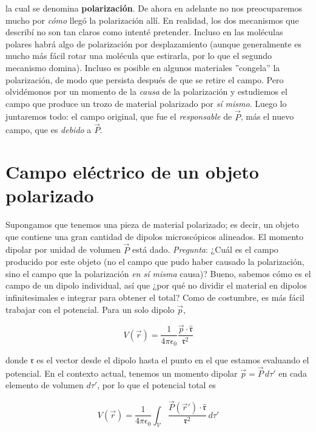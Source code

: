 \documentclass[12pt,a4paper]{report}
\newcommand{\esp}{\vspace{0.5cm}}
\begin{document}
	\noindent la cual se denomina \textbf{polarización}. De ahora en adelante no nos preocuparemos mucho por \textit{cómo} llegó la polarización allí. En realidad, los dos mecanismos que describí no son tan claros como intenté pretender. Incluso en las moléculas polares habrá algo de polarización por desplazamiento (aunque generalmente es mucho más fácil rotar una molécula que estirarla, por lo que el segundo mecanismo domina). Incluso es posible en algunos materiales ''congela'' la polarización, de modo que persista después de que se retire el campo. Pero olvidémonos por un momento de la \textit{causa} de la polarización y estudiemos el campo que produce un trozo de material polarizado por \textit{sí mismo}. Luego lo juntaremos todo: el campo original, que fue el \textit{responsable} de $\vec{P}$, más el nuevo campo, que es \textit{debido} a $\vec{P}$.
	
	\section{Campo eléctrico de un objeto polarizado}
	
	Supongamos que tenemos una pieza de material polarizado; es decir, un objeto que contiene una gran cantidad de dipolos microscópicos alineados. El momento dipolar por unidad de volumen $\vec{P}$ está dado. \textit{Pregunta}: ¿Cuál es el campo producido por este objeto (no el campo que pudo haber causado la polarización, sino el campo que la polarización \textit{en sí misma} causa)? Bueno, sabemos cómo es el campo de un dipolo individual, así que ¿por qué no dividir el material en dipolos infinitesimales e integrar para obtener el total? Como de costumbre, es más fácil trabajar con el potencial. Para un solo dipolo $\vec{p}$,
	
	\esp
	
	\begin{equation}
		V(\vec{r}) = \frac{1}{4\pi\epsilon_0} \frac{\vec{p} \cdot \hat{\mathfrak{r}}}{\mathfrak{r}^2}
	\end{equation}
	
	\esp
	
	donde $\mathfrak{r}$ es el vector desde el dipolo hasta el punto en el que estamos evaluando el potencial. En el contexto actual, tenemos un momento dipolar $\vec{p} = \vec{P} \, d\tau'$ en cada elemento de volumen $d\tau'$, por lo que el potencial total es
	
	\begin{equation}
		V(\vec{r}) = \frac{1}{4\pi\epsilon_0} \int_{\mathcal{V}} \frac{\vec{P}(\vec{r}') \cdot \hat{\mathfrak{r}}}{\mathfrak{r}^2} \, d\tau'
		\label{eq:og}
	\end{equation}
	
\end{document}
